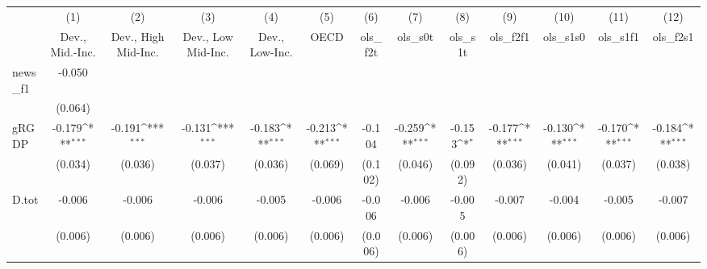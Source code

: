 {
\def\sym#1{\ifmmode^{#1}\else\(^{#1}\)\fi}
\begin{tabular}{l*{12}{c}}
\toprule
            &\multicolumn{1}{c}{(1)}&\multicolumn{1}{c}{(2)}&\multicolumn{1}{c}{(3)}&\multicolumn{1}{c}{(4)}&\multicolumn{1}{c}{(5)}&\multicolumn{1}{c}{(6)}&\multicolumn{1}{c}{(7)}&\multicolumn{1}{c}{(8)}&\multicolumn{1}{c}{(9)}&\multicolumn{1}{c}{(10)}&\multicolumn{1}{c}{(11)}&\multicolumn{1}{c}{(12)}\\
            &\multicolumn{1}{c}{Dev., Mid.-Inc.}&\multicolumn{1}{c}{Dev., High Mid-Inc.}&\multicolumn{1}{c}{Dev., Low Mid-Inc.}&\multicolumn{1}{c}{Dev., Low-Inc.}&\multicolumn{1}{c}{OECD}&\multicolumn{1}{c}{ols\_f2t}&\multicolumn{1}{c}{ols\_s0t}&\multicolumn{1}{c}{ols\_s1t}&\multicolumn{1}{c}{ols\_f2f1}&\multicolumn{1}{c}{ols\_s1s0}&\multicolumn{1}{c}{ols\_s1f1}&\multicolumn{1}{c}{ols\_f2s1}\\
\midrule
news\_f1     &      -0.050         &                     &                     &                     &                     &                     &                     &                     &                     &                     &                     &                     \\
            &     (0.064)         &                     &                     &                     &                     &                     &                     &                     &                     &                     &                     &                     \\
\addlinespace
gRGDP       &      -0.179\sym{***}&      -0.191\sym{***}&      -0.131\sym{***}&      -0.183\sym{***}&      -0.213\sym{***}&      -0.104         &      -0.259\sym{***}&      -0.153\sym{*}  &      -0.177\sym{***}&      -0.130\sym{***}&      -0.170\sym{***}&      -0.184\sym{***}\\
            &     (0.034)         &     (0.036)         &     (0.037)         &     (0.036)         &     (0.069)         &     (0.102)         &     (0.046)         &     (0.092)         &     (0.036)         &     (0.041)         &     (0.037)         &     (0.038)         \\
\addlinespace
D.tot       &      -0.006         &      -0.006         &      -0.006         &      -0.005         &      -0.006         &      -0.006         &      -0.006         &      -0.005         &      -0.007         &      -0.004         &      -0.005         &      -0.007         \\
            &     (0.006)         &     (0.006)         &     (0.006)         &     (0.006)         &     (0.006)         &     (0.006)         &     (0.006)         &     (0.006)         &     (0.006)         &     (0.006)         &     (0.006)         &     (0.006)         \\

\end{tabular}}
